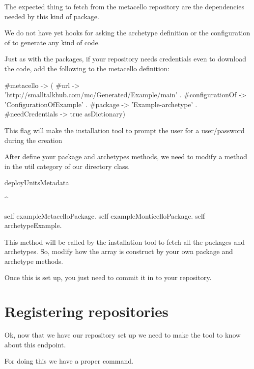 \documentclass[a4paper,10pt,twoside]{book}
\begin{document}
					
					The expected thing to fetch from the metacello repository are the dependencies needed by this kind of package. 
					
					We do not have yet hooks for asking the archetype definition or the configuration of to generate any kind of code. 
					
					
					Just as with the packages, if your repository needs credentials even to download the code, add the following to the metacello definition: 
					
					
					
		\begin{code}
		#metacello -> ({ 
				#url -> 'http://smalltalkhub.com/mc/Generated/Example/main' . 
				#configurationOf -> 'ConfigurationOfExample' . 
				#package -> 'Example-archetype'  .
				#needCredentials -> true
			} asDictionary)
		\end{code}
						
						This flag will make the installation tool to prompt the user for a user/password during the creation
					
					
					
					
					
					After define your package and archetypes methods, we need to modify a method in the util category of our directory class. 
					
					
				\begin{code}
deployUnitsMetadata

	^ { 
	
		self exampleMetacelloPackage.
		self exampleMonticelloPackage.
		self archetypeExample.
	
	 }
				\end{code}
					
					This method will be called by the installation tool to fetch all the packages and archetypes. So, modify how the array is construct by your own package and archetype methods.
					
					
					Once this is set up, you just need to commit it in to your repository. 
					
					\section {Registering repositories}
					
					Ok, now that we have our repository set up we need to make the tool to know about this endpoint. 
					
					For doing this we have a proper command. 
					
\end{document}
